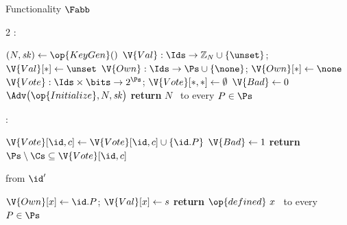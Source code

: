 \begin{interface}[nofloat]{Functionality $\Fabb$ \\
}

{\scriptsize
\setlength{\columnsep}{1.4em}
\begin{multicols}{2}
:
\begin{algorithmic}[1]
\setcounter{contline}{0}\algcont
\State $(N, \mathit{sk}) \gets \op{KeyGen}()$ \label{ln:abbkey}
\State $\V{Val} : \Ids \to \mathbb{Z}_N \cup \{\unset\}$; \quad $\V{Val}[*] \gets \unset$
\State $\V{Own} : \Ids \to \Ps \cup \{\none\}$; \quad $\V{Own}[*] \gets \none$
\State $\V{Vote} : \Ids \times \bits \to 2^{\Ps}$; \quad $\V{Vote}[*,*] \gets \emptyset$
\State $\V{Bad} \gets 0$
\State $\Adv\bigl(\op{Initialize}, N, \mathit{sk}\bigr)$ \label{ln:abbleakkey}
\State \textbf{return} $N$ \ to every $P \in \Ps$
\algsave
\end{algorithmic}
\vspace{1.4ex}

:
\begin{algorithmic}[1]
\algcont
\State $\V{Vote}[\id, c] \gets \V{Vote}[\id, c] \cup \{\id.P\}$
  \State $\V{Bad} \gets 1$ \label{ln:abbdisagree}
\EndIf
\State \textbf{return} $\Ps \setminus \Cs \subseteq \V{Vote}[\id, c]$ \label{ln:abbunan}
\algsave
\end{algorithmic}
\vspace{1.4ex}

\columnbreak

 \quad from $\id'$
\begin{algorithmic}[1]
\algcont
{}
 \label{ln:abbloadagree}
\State $\V{Own}[x] \gets \id.P$; \quad $\V{Val}[x] \gets s$ \label{ln:abbload}
\State \textbf{return} $\op{defined}\ x$ \ to every $P \in \Ps$
\algsave
\end{algorithmic}
\vspace{1.4ex}


\end{multicols}}
\end{interface}
